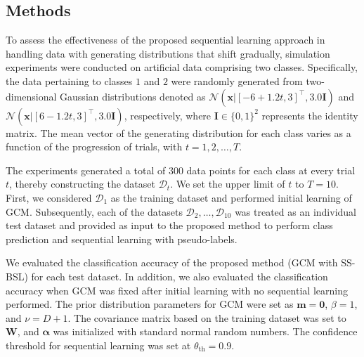 \documentclass[letterpaper, 10 pt, conference]{ieeeconf}
\begin{document}
\subsection{Methods}
To assess the effectiveness of the proposed sequential learning approach in handling data with generating distributions that shift gradually, simulation experiments were conducted on artificial data comprising two classes.
Specifically, the data pertaining to classes $1$ and $2$ were randomly generated from two-dimensional Gaussian distributions denoted as $\mathcal{N}(\mathbf{x} | [-6+1.2t,3]^{\top}, 3.0 \mathbf{I})$ and $\mathcal{N}(\mathbf{x} | [6 - 1.2t,3]^{\top}, 3.0 \mathbf{I})$, respectively, where $\mathbf{I} \in \{0,1\}^{2}$ represents the identity matrix.
The mean vector of the generating distribution for each class varies as a function of the progression of trials, with $t= 1, 2, \ldots, T$.

The experiments generated a total of $300$ data points for each class at every trial $t$, thereby constructing the dataset $\mathcal{D}_{t}$. 
We set the upper limit of $t$ to $T=10$. 
First, we considered $\mathcal{D}_1$ as the training dataset and performed initial learning of GCM. 
Subsequently, each of the datasets $\mathcal{D}_2,\ldots,\mathcal{D}_{10}$ was treated as an individual test dataset and provided as input to the proposed method to perform class prediction and sequential learning with pseudo-labels.

We evaluated the classification accuracy of the proposed method (GCM with SS-BSL) for each test dataset. 
In addition, we also evaluated the classification accuracy when GCM was fixed after initial learning with no sequential learning performed.
The prior distribution parameters for GCM were set as $\mathbf{m}=\mathbf{0}$, $\beta=1$, and $\nu = D + 1$.
The covariance matrix based on the training dataset was set to $\mathbf{W}$, and $\boldsymbol{\alpha}$ was initialized with standard normal random numbers. 
The confidence threshold for sequential learning was set at $\theta_{\mathrm{th}} = 0.9$.
\end{document}
